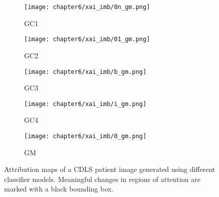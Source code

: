 \documentclass[../report.tex]{subfiles}
\begin{document}
		\begin{figure}[H]
		\begin{subfigure}[t]{1\textwidth}
			\centering
			\texttt{[image: chapter6/xai\_imb/0n\_gm.png]}
			\caption{GC1}
			\label{fig_cdls_imb_a}
		\end{subfigure}
			\begin{subfigure}[t]{1\textwidth}
			\centering
			\texttt{[image: chapter6/xai\_imb/01\_gm.png]}
			\caption{GC2}
			\label{fig_cdls_imb_b}
		\end{subfigure}
			\begin{subfigure}[t]{1\textwidth}
			\centering
			\texttt{[image: chapter6/xai\_imb/b\_gm.png]}
			\caption{GC3}
			\label{fig_cdls_imb_c}
		\end{subfigure}
			\begin{subfigure}[t]{1\textwidth}
			\centering
			\texttt{[image: chapter6/xai\_imb/i\_gm.png]}
			\caption{GC4}
			\label{fig_cdls_imb_d}
		\end{subfigure}
			\begin{subfigure}[t]{1\textwidth}
			\centering
			\texttt{[image: chapter6/xai\_imb/0\_gm.png]}
			\caption{GM}
			\label{fig_cdls_imb_e}
		\end{subfigure}
	\caption{Attribution maps of a CDLS patient image generated using different classifier models. Meaningful changes in regions of attention are marked with a black bounding box.}
	\label{fig_cdls_imb}
	\end{figure}
	
\end{document}
